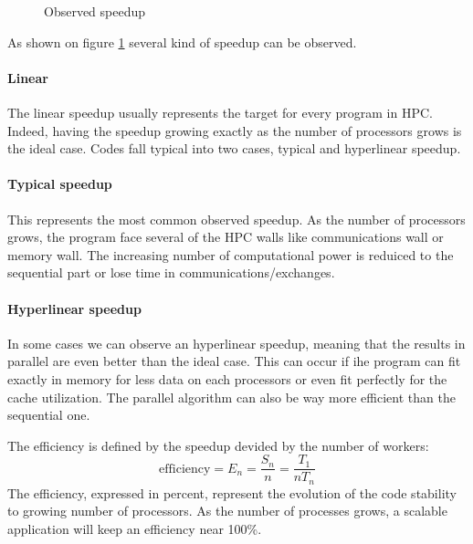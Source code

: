 \begin{figure}
\centering 
{}
\caption{Observed speedup}
\label{fig:1_HPC:speedup_obs}
\end{figure}

As shown on figure \ref{fig:1_HPC:speedup_obs} several kind of speedup can be observed. 
\paragraph{Linear}
The linear speedup usually represents the target for every program in HPC. 
Indeed, having the speedup growing exactly as the number of processors grows is the ideal case. 
Codes fall typical into two cases, typical and hyperlinear speedup. 
\paragraph{Typical speedup}
This represents the most common observed speedup. 
As the number of processors grows, the program face several of the HPC walls like communications wall or memory wall. 
The increasing number of computational power is reduiced to the sequential part or lose time in communications/exchanges. 
\paragraph{Hyperlinear speedup}
In some cases we can observe an hyperlinear speedup, meaning that the results in parallel are even better than the ideal case. 
This can occur if ihe program can fit exactly in memory for less data on each processors or even fit perfectly for the cache utilization. 
The parallel algorithm can also be way more efficient than the sequential one. 

The efficiency is defined by the speedup devided by the number of workers: 
\begin{equation}
\text{efficiency} = E_n = \frac{S_n}{n} = \frac{T_1}{nT_n}
\end{equation}
The efficiency, expressed in percent, represent the evolution of the code stability to growing number of processors. 
As the number of processes grows, a scalable application will keep an efficiency near 100\%.

